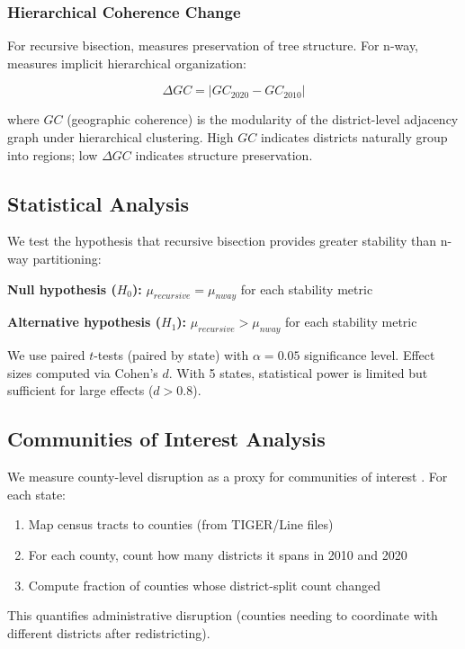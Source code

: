 \subsubsection{Hierarchical Coherence Change}

For recursive bisection, measures preservation of tree structure. For n-way, measures implicit hierarchical organization:

$$\Delta GC = |GC_{2020} - GC_{2010}|$$

where $GC$ (geographic coherence) is the modularity of the district-level adjacency graph under hierarchical clustering. High $GC$ indicates districts naturally group into regions; low $\Delta GC$ indicates structure preservation.

\subsection{Statistical Analysis}

We test the hypothesis that recursive bisection provides greater stability than n-way partitioning:

\textbf{Null hypothesis ($H_0$):} $\mu_{recursive} = \mu_{nway}$ for each stability metric

\textbf{Alternative hypothesis ($H_1$):} $\mu_{recursive} > \mu_{nway}$ for each stability metric

We use paired $t$-tests (paired by state) with $\alpha = 0.05$ significance level. Effect sizes computed via Cohen's $d$. With 5 states, statistical power is limited but sufficient for large effects ($d > 0.8$).

\subsection{Communities of Interest Analysis}

We measure county-level disruption as a proxy for communities of interest \citep{communities_of_interest}. For each state:

\begin{enumerate}
    \item Map census tracts to counties (from TIGER/Line files)
    \item For each county, count how many districts it spans in 2010 and 2020
    \item Compute fraction of counties whose district-split count changed
\end{enumerate}

This quantifies administrative disruption (counties needing to coordinate with different districts after redistricting).
